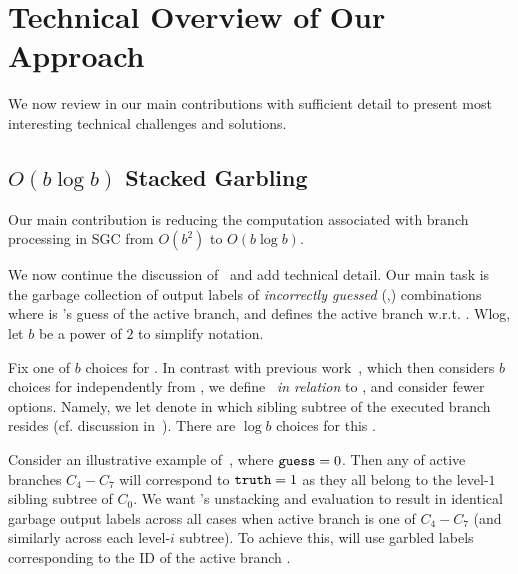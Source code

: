 
\section{Technical Overview of Our Approach}
\label{sec:techOverview}

We  now review in our main contributions with sufficient  detail to present most interesting  technical challenges and  solutions.

\subsection{$O(b\log b)$ Stacked Garbling}
\label{sec:techOverviewSG}

Our main contribution is reducing the computation associated with branch processing in SGC from $O(b^2)$ to $O(b \log b)$.

We now continue the discussion of~ and add  technical detail.  
Our main task is the garbage collection of output labels of {\em incorrectly guessed} (\truth,\guess) combinations 
where
\guess is \E's guess of the active branch, and \truth defines the active branch w.r.t. \guess.   Wlog, let $b$ be a power of $2$ to simplify notation.

Fix one of $b$ choices for \guess.  In contrast with previous work~\HK, which then considers $b$ choices for \truth independently from \guess, we define \truth\ {\em in relation} to \guess, and consider fewer \truth options.  Namely,
we  let \truth  denote in which sibling subtree of \guess the executed branch resides (cf. discussion in~).  There are $\log b$ choices for this \truth.

Consider an illustrative example of~, where $\mathtt{guess}=0$.  Then any of active branches $C_4-C_7$ will correspond to $\mathtt{truth} = 1$ as they all belong to the level-$1$ sibling subtree of $C_0$.  We want \E's unstacking and evaluation to result in identical garbage output labels across all cases when active branch is one of $C_4-C_7$  (and similarly across each level-$i$ subtree).  To achieve this, \E will use garbled labels corresponding to the ID of the active branch \aid.



